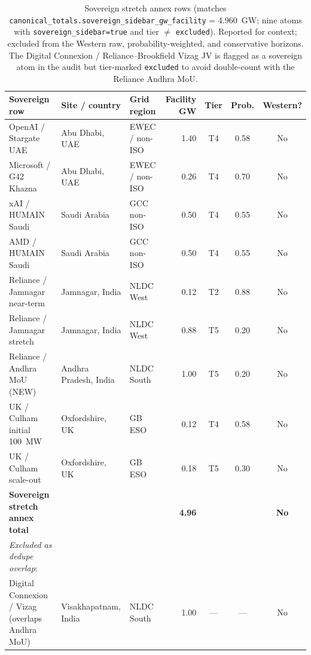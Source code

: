\documentclass[11pt,a4paper]{article}
\begin{document}
\begin{table}[H]
\centering
\scriptsize
\renewcommand{\arraystretch}{1.18}
\setlength{\tabcolsep}{4pt}
\begin{tabular}{@{}L{3.4cm}L{2.2cm}L{1.8cm}rccc@{}}
\toprule
\textbf{Sovereign row} & \textbf{Site / country} & \textbf{Grid region} & \textbf{Facility GW} & \textbf{Tier} & \textbf{Prob.} & \textbf{Western?} \\
\midrule
OpenAI / Stargate UAE & Abu Dhabi, UAE & EWEC / non-ISO & 1.40 & T4 & 0.58 & No \\
Microsoft / G42 Khazna & Abu Dhabi, UAE & EWEC / non-ISO & 0.26 & T4 & 0.70 & No \\
xAI / HUMAIN Saudi & Saudi Arabia & GCC non-ISO & 0.50 & T4 & 0.55 & No \\
AMD / HUMAIN Saudi & Saudi Arabia & GCC non-ISO & 0.50 & T4 & 0.55 & No \\
Reliance / Jamnagar near-term & Jamnagar, India & NLDC West & 0.12 & T2 & 0.88 & No \\
Reliance / Jamnagar stretch & Jamnagar, India & NLDC West & 0.88 & T5 & 0.20 & No \\
Reliance / Andhra MoU (NEW) & Andhra Pradesh, India & NLDC South & 1.00 & T5 & 0.20 & No \\
UK / Culham initial 100~MW & Oxfordshire, UK & GB ESO & 0.12 & T4 & 0.58 & No \\
UK / Culham scale-out & Oxfordshire, UK & GB ESO & 0.18 & T5 & 0.30 & No \\
\midrule
\textbf{Sovereign stretch annex total} & & & \textbf{4.96} & & & \textbf{No} \\
\midrule
\textit{Excluded as dedupe overlap}: & & & & & & \\
Digital Connexion / Vizag (overlaps Andhra MoU) & Visakhapatnam, India & NLDC South & 1.00 & --- & --- & No \\
\bottomrule
\end{tabular}
\caption{Sovereign stretch annex rows (matches \texttt{canonical\_totals.sovereign\_sidebar\_gw\_facility} = 4.960~GW; nine atoms with \texttt{sovereign\_sidebar=true} and tier $\neq$ \texttt{excluded}). Reported for context; excluded from the Western raw, probability-weighted, and conservative horizons. The Digital Connexion / Reliance--Brookfield Vizag JV is flagged as a sovereign atom in the audit but tier-marked \texttt{excluded} to avoid double-count with the Reliance Andhra MoU.}
\end{table}

\newpage
\end{document}
